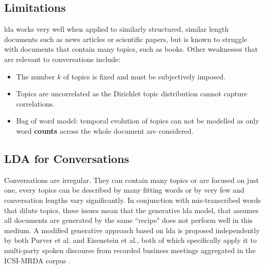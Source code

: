     \subsection{Limitations}
    \gls{lda} works very well when applied to similarly structured, similar length documents such as news articles\cite{blei2003latent, newman2006probabilistic} or scientific papers\cite{griffiths2004finding, wang2011collaborative}, but is known to struggle with documents that contain many topics, such as books\cite{tang2014understanding}. Other weaknesses that are relevant to conversations include:
    \begin{itemize}
        \item The number $k$ of topics is fixed and must be subjectively imposed.
        \item Topics are uncorrelated as the Dirichlet topic distribution cannot capture correlations.
        \item Bag of word model: temporal evolution of topics can not be modelled as only word \textbf{counts} across the whole document are considered.
    \end{itemize}
    
    \subsection{LDA for Conversations \label{sssec: lda for conversations}}
    Conversations are irregular. They can contain many topics or are focused on just one, every topics can be described by many fitting words or by very few and conversation lengths vary significantly. In conjunction with mis-transcribed words that dilute topics, these issues mean that the generative \gls{lda} model, that assumes all documents are generated by the same ``recipe" does not perform well in this medium\cite{purver2006unsupervised, tang2014understanding}. A modified generative approach based on \gls{lda} is proposed independently by both Purver et al.\cite{purver2006unsupervised} and Eisenstein et al.\cite{eisenstein2008bayesian}, both of which specifically apply it to multi-party spoken discourse from recorded business meetings aggregated in the ICSI-MRDA corpus \cite{shriberg2004icsi}. \newline